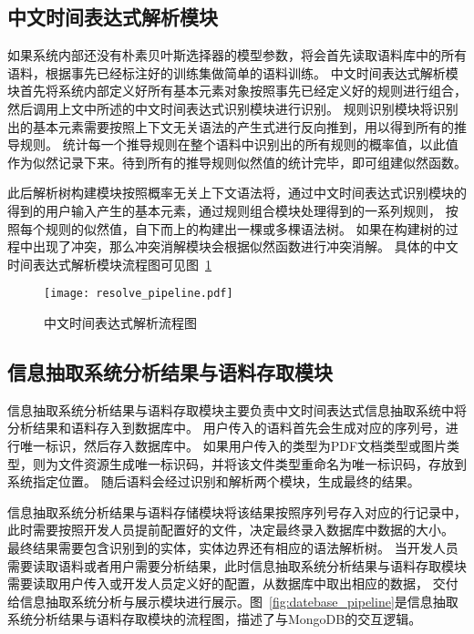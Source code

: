 \subsection{中文时间表达式解析模块}

如果系统内部还没有朴素贝叶斯选择器的模型参数，将会首先读取语料库中的所有语料，根据事先已经标注好的训练集做简单的语料训练。
中文时间表达式解析模块首先将系统内部定义好所有基本元素对象按照事先已经定义好的规则进行组合，然后调用上文中所述的中文时间表达式识别模块进行识别。
规则识别模块将识别出的基本元素需要按照上下文无关语法的产生式进行反向推到，用以得到所有的推导规则。
统计每一个推导规则在整个语料中识别出的所有规则的概率值，以此值作为似然记录下来。待到所有的推导规则似然值的统计完毕，即可组建似然函数。

此后解析树构建模块按照概率无关上下文语法将，通过中文时间表达式识别模块的得到的用户输入产生的基本元素，通过规则组合模块处理得到的一系列规则，
按照每个规则的似然值，自下而上的构建出一棵或多棵语法树。
如果在构建树的过程中出现了冲突，那么冲突消解模块会根据似然函数进行冲突消解。
具体的中文时间表达式解析模块流程图可见图~\ref{fig:resolve_pipeline}

\begin{figure}[h]
  \centering
  \texttt{[image: resolve\_pipeline.pdf]}
  \caption{中文时间表达式解析流程图}
  \label{fig:resolve_pipeline}
\end{figure}

\subsection{信息抽取系统分析结果与语料存取模块}

信息抽取系统分析结果与语料存取模块主要负责中文时间表达式信息抽取系统中将分析结果和语料存入到数据库中。
用户传入的语料首先会生成对应的序列号，进行唯一标识，然后存入数据库中。
如果用户传入的类型为PDF文档类型或图片类型，则为文件资源生成唯一标识码，并将该文件类型重命名为唯一标识码，存放到系统指定位置。
随后语料会经过识别和解析两个模块，生成最终的结果。

信息抽取系统分析结果与语料存储模块将该结果按照序列号存入对应的行记录中，此时需要按照开发人员提前配置好的文件，决定最终录入数据库中数据的大小。
最终结果需要包含识别到的实体，实体边界还有相应的语法解析树。
当开发人员需要读取语料或者用户需要分析结果，此时信息抽取系统分析结果与语料存取模块需要读取用户传入或开发人员定义好的配置，从数据库中取出相应的数据，
交付给信息抽取系统分析与展示模块进行展示。图~\ref{fig:datebase_pipeline}是信息抽取系统分析结果与语料存取模块的流程图，描述了与MongoDB的交互逻辑。

